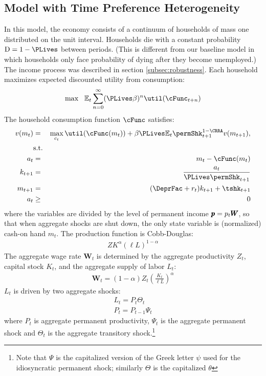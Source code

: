 \documentclass[../../cjSOE.tex]{subfiles}
\begin{document}
\subsection{Model with Time Preference Heterogeneity}

In this model, the economy consists of a continuum of households of mass one distributed on the unit interval. Households die with a constant probability $\mathrm{D}=1-\PLives$ between periods. (This is different from our baseline model in which households only face probability of dying after they become unemployed.) The income process was described in section \ref{subsec:robustness}. Each household maximizes expected discounted utility from consumption:
\begin{equation}
\max~~\mathbb{E}_{t}\sum_{n=0}^{\infty}(\PLives\beta)^{n}\util(\cFunc_{t+n})
\end{equation}
The household consumption function $\cFunc$ satisfies:
\begin{eqnarray*}
v(m_{t}) & = & \max_{c_{t}} \util(\cFunc(m_{t}))+\beta\PLives\mathbb{E}_{t}\permShk_{t+1}^{1-\CRRA}v(m_{t+1}), \label{eq:tran}
\\ & \text{s.t.} & \nonumber
\\a_{t} & = & m_{t}-\cFunc(m_{t})
\\k_{t+1} & = & \frac{a_{t}}{\PLives \permShk_{t+1}}
\\m_{t+1} & = & (\DeprFac+r_{t})k_{t+1}+\tshk_{t+1}
\\a_{t} & \geq & 0
\end{eqnarray*}
where the variables are divided by the level of permanent income $\pmb{p} = p_{t}\pmb{W}$, so that
when aggregate shocks are shut down, the only state variable is (normalized) cash-on hand $m_{t}$.
The production function is Cobb-Douglas:
\begin{align}
ZK^{\alpha}(\ell L)^{1-\alpha}
\end{align}
The aggregate wage rate $\pmb{W}_{t}$ is determined by the aggregate productivity $Z_{t}$, capital stock $K_{t}$, and the aggregate supply of labor $L_{t}$:
\begin{align}
\pmb{W}_{t}=(1-\alpha)Z_{t}(\frac{K_{t}}{\ell L})^{\alpha}
\end{align}
$L_{t}$ is driven by two aggregate shocks:
\begin{align}
L_{t}=P_{t}\Theta_{t}
\\P_{t}=P_{t-1}\Psi_{t}
\end{align}
where $P_{t}$ is aggregate permanent productivity, 	$\Psi_{t}$ is the aggregate permanent shock
and $\Theta_{t}$ is the aggregate transitory shock.\footnote{Note that $\Psi$ is the capitalized version of the Greek letter $\psi$ used for the idiosyncratic permanent shock; similarly $\Theta$ is the capitalized $\theta$}

%

%
\end{document}

